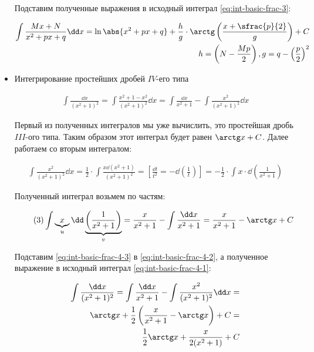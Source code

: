 \begin{itemize}
Подставим полученные выражения в исходный интеграл \eqref{eq:int-basic-frac-3}:

\begin{align*}
  \int \frac{Mx + N}{x^2 + px + q} \dd x =  
  \ln \abs{x^2 + px + q} +
  \frac{h}{g} \cdot \arctg \left(\frac{x + \sfrac{p}{2}}{g}\right) + C \\
  h = \left( N - \frac{Mp}{2} \right), g = q - \left(\frac{p}{2}\right)^2
\end{align*}

\item Интегрирование простейших дробей \(IV\)-его типа

\begin{example}
  \begin{align*}\label{eq:int-basic-frac-4-1}\tag{1}
    \int \frac{\dd x}{(x^2 + 1)^2} =
    \int \frac{x^2 + 1 - x^2}{(x^2 + 1)^2} \dd x =
    \int \frac{\dd x}{x^2 + 1} - \int \frac{x^2}{(x^2 + 1)^2} \dd x
  \end{align*}
  
  Первый из полученных интегралов мы уже вычислить, это простейшая дробь
  \(III\)-ого типа. Таким образом этот интеграл будет равен \(\arctg x + C\).
  Далее работаем со вторым интегралом:
  
  \begin{align*}\label{eq:int-basic-frac-4-2}\tag{2}
    \int \frac{x^2}{(x^2 + 1)^2} \dd x =
    \frac{1}{2} \cdot \int \frac{x \dd (x^2 + 1)}{(x^2 + 1)^2} =
    \left[
      \frac{\dd t}{t^2} = -\dd \left(\frac{1}{t}\right)
    \right] =
    -\frac{1}{2} \cdot \int x \cdot \dd \left( \frac{1}{x^2 + 1} \right) 
  \end{align*}
  
  Полученный интеграл возьмем по частям:
  
  \begin{align*}\label{eq:int-basic-frac-4-3}\tag{3}
    \int \underbrace{x}_{u} \dd \underbrace{\left(\frac{1}{x^2 + 1}\right)}_{v} =
    \frac{x}{x^2 + 1} - \int \frac{\dd x}{x^2 + 1} =
    \frac{x}{x^2 + 1} - \arctg x + C 
  \end{align*}
  
  Подставим \eqref{eq:int-basic-frac-4-3} в \eqref{eq:int-basic-frac-4-2}, а
  полученное выражение в исходный интеграл \eqref{eq:int-basic-frac-4-1}:
  
  \begin{align*}
    \int \frac{\dd x}{(x^2 + 1)^2} =
    \int \frac{\dd x}{x^2 + 1} - \int \frac{x^2}{(x^2 + 1)^2} \dd x = \\
    \arctg x + \frac{1}{2} \left(\frac{x}{x^2 + 1} - \arctg x\right) + C = \\
    \frac{1}{2} \arctg x + \frac{x}{2 (x^2 + 1)} + C
  \end{align*}
  

\end{example}
\end{itemize}

